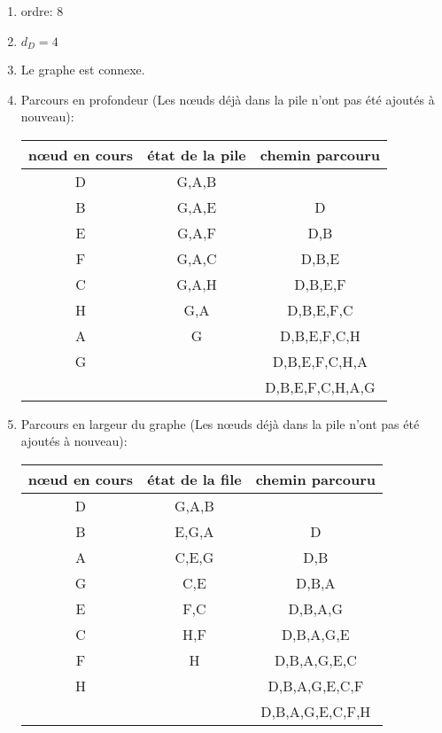 \documentclass[a4paper,11pt]{article}
\begin{document}
\begin{Form}
\begin{exo}
\begin{enumerate}
\item ordre: 8
\item $d_D=4$
\item Le graphe est connexe.
\item Parcours en profondeur (Les nœuds déjà dans la pile n'ont pas été ajoutés à nouveau):\\
\begin{center}
\begin{tabular}{|c|c|c|}
\hline 
nœud en cours & état de la pile & chemin parcouru \\ 
\hline 
D & G,A,B &  \\ 
\hline 
B & G,A,E & D \\ 
\hline 
E & G,A,F & D,B \\ 
\hline 
F & G,A,C & D,B,E \\ 
\hline 
C & G,A,H & D,B,E,F \\ 
\hline 
H & G,A & D,B,E,F,C \\ 
\hline 
A & G & D,B,E,F,C,H \\ 
\hline 
G &  & D,B,E,F,C,H,A \\ 
\hline 
 &  & D,B,E,F,C,H,A,G \\ 
\hline 
\end{tabular} 
\end{center}
\item Parcours en largeur du graphe (Les nœuds déjà dans la pile n'ont pas été ajoutés à nouveau):\\
\begin{center}
\begin{tabular}{|c|c|c|}
\hline 
nœud en cours & état de la file & chemin parcouru \\ 
\hline 
D & G,A,B &  \\ 
\hline 
B & E,G,A & D \\ 
\hline
A & C,E,G & D,B \\ 
\hline
G & C,E & D,B,A \\ 
\hline
E & F,C & D,B,A,G \\ 
\hline
C & H,F & D,B,A,G,E \\ 
\hline
F & H & D,B,A,G,E,C \\ 
\hline
H &  & D,B,A,G,E,C,F \\ 
\hline
 &  & D,B,A,G,E,C,F,H \\ 
\hline
\end{tabular} 
\end{center}

\end{enumerate}
\end{exo}
\end{Form}
\end{document}
